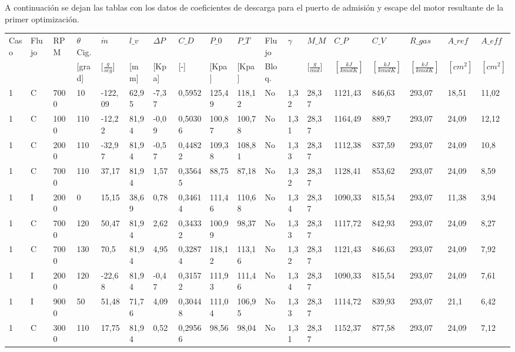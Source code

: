 \label{anexo:1}
A continuación se dejan las tablas con los datos de coeficientes de descarga
para el puerto de admisión y escape del motor resultante de la primer
optimización.

{\tiny
\begin{landscape}
    \begin{longtable}{llllllllllllllllll} \toprule
    Caso & Flujo & RPM & $\theta$ Cig. & $\dot{m}$ & $l\_v$ & $\Delta P$ & $C\_D$ & $P\_0$ & $P\_T$ & Flujo & $\gamma$ & $M\_M$ & $C\_P$ & $C\_V$ & $R\_{gas}$ & $A\_{ref}$ & $A\_{eff}$ \\
     &  &  & [grad] & [$\frac{g}{seg}$] & [mm] & [Kpa] & [-] & [Kpa] & [Kpa] & Bloq. &  & [$\frac{g}{mol}$] & $[\frac{kJ}{kmol K}]$ & $[\frac{kJ}{kmol K}]$ & $[\frac{kJ}{kmol K}]$ & $[cm^2]$ & $[cm^2]$ \\ \midrule
    1 & C & 7000 & 10 & -122,09 & 62,95 & -7,37 & 0,5952 & 125,49 & 118,12 & No & 1,32 & 28,37 & 1121,43 & 846,63 & 293,07 & 18,51 & 11,02 \\
    1 & C & 1000 & 110 & -12,22 & 81,94 & -0,09 & 0,50306 & 100,87 & 100,78 & No & 1,31 & 28,37 & 1164,49 & 889,7 & 293,07 & 24,09 & 12,12 \\
    1 & C & 2000 & 110 & -32,97 & 81,94 & -0,57 & 0,44822 & 109,38 & 108,81 & No & 1,33 & 28,37 & 1112,38 & 837,59 & 293,07 & 24,09 & 10,8 \\
    1 & C & 7000 & 110 & 37,17 & 81,94 & 1,57 & 0,35645 & 88,75 & 87,18 & No & 1,32 & 28,37 & 1128,41 & 853,62 & 293,07 & 24,09 & 8,59 \\
    1 & I & 2000 & 0 & 15,15 & 38,69 & 0,78 & 0,34614 & 111,46 & 110,68 & No & 1,34 & 28,37 & 1090,33 & 815,54 & 293,07 & 11,38 & 3,94 \\
    1 & C & 7000 & 120 & 50,47 & 81,94 & 2,62 & 0,34332 & 100,99 & 98,37 & No & 1,33 & 28,37 & 1117,72 & 842,93 & 293,07 & 24,09 & 8,27 \\
    1 & C & 7000 & 130 & 70,5 & 81,94 & 4,95 & 0,32874 & 118,12 & 113,16 & No & 1,32 & 28,37 & 1121,43 & 846,63 & 293,07 & 24,09 & 7,92 \\
    1 & I & 2000 & 120 & -22,68 & 81,94 & -0,47 & 0,31572 & 111,93 & 111,46 & No & 1,34 & 28,37 & 1090,33 & 815,54 & 293,07 & 24,09 & 7,61 \\
    1 & I & 9000 & 50 & 51,48 & 71,76 & 4,09 & 0,30448 & 111,04 & 106,95 & No & 1,33 & 28,37 & 1114,72 & 839,93 & 293,07 & 21,1 & 6,42 \\
    1 & C & 3000 & 110 & 17,75 & 81,94 & 0,52 & 0,29566 & 98,56 & 98,04 & No & 1,31 & 28,37 & 1152,37 & 877,58 & 293,07 & 24,09 & 7,12 \\

\end{longtable}
\end{landscape}}
